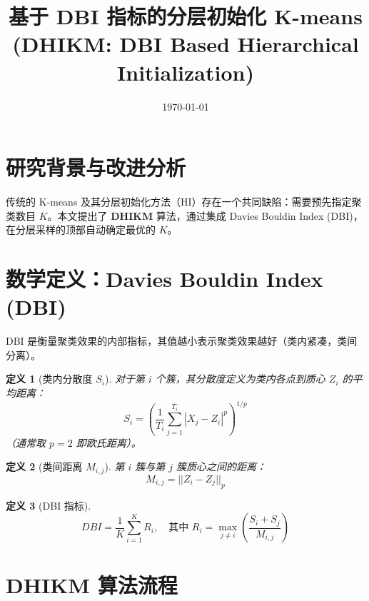 \documentclass[11pt,a4paper]{article}
\title{基于 DBI 指标的分层初始化 K-means \\ (DHIKM: DBI Based Hierarchical Initialization)}
\date{\today}
\newtheorem{definition}{定义}
\begin{document}
\maketitle

\section{研究背景与改进分析}
传统的 K-means 及其分层初始化方法（HI）存在一个共同缺陷：需要预先指定聚类数目 $K$。本文提出了 \textbf{DHIKM} 算法，通过集成 Davies Bouldin Index (DBI)，在分层采样的顶部自动确定最优的 $K$。

\section{数学定义：Davies Bouldin Index (DBI)}
DBI 是衡量聚类效果的内部指标，其值越小表示聚类效果越好（类内紧凑，类间分离）。

\begin{definition}[类内分散度 $S_i$]
对于第 $i$ 个簇，其分散度定义为类内各点到质心 $Z_i$ 的平均距离：
\begin{equation}
    S_i = \left( \frac{1}{T_i} \sum_{j=1}^{T_i} |X_j - Z_i|^p \right)^{1/p}
\end{equation}
（通常取 $p=2$ 即欧氏距离）。
\end{definition}

\begin{definition}[类间距离 $M_{i,j}$]
第 $i$ 簇与第 $j$ 簇质心之间的距离：
\begin{equation}
    M_{i,j} = ||Z_i - Z_j||_p
\end{equation}
\end{definition}

\begin{definition}[DBI 指标]
\begin{equation}
    DBI = \frac{1}{K} \sum_{i=1}^{K} R_i, \quad \text{其中 } R_i = \max_{j \neq i} \left( \frac{S_i + S_j}{M_{i,j}} \right)
\end{equation}
\end{definition}

\section{DHIKM 算法流程}
\end{document}

